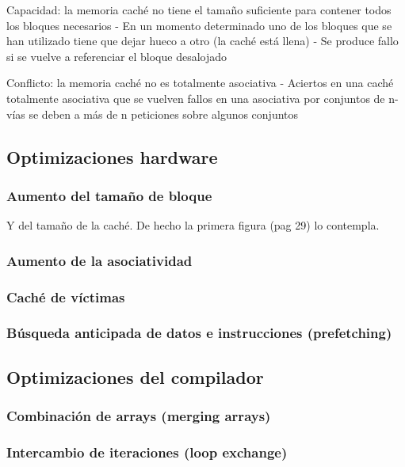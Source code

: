 \documentclass[12pt,onecolumn]{memoir}
\begin{document}
Capacidad: la memoria caché no tiene el tamaño suficiente para 
contener todos los bloques necesarios
- En un momento determinado uno de los bloques que se han 
utilizado tiene que dejar hueco a otro (la caché está llena)
- Se produce fallo si se vuelve a referenciar el bloque desalojado

Conflicto: la memoria caché no es totalmente asociativa 
- Aciertos en una caché totalmente asociativa que se vuelven 
fallos en una asociativa por conjuntos de 
n-vías se deben a más de n peticiones sobre algunos conjuntos

\subsection{Optimizaciones hardware}

\subsubsection{Aumento del tamaño de bloque}

Y del tamaño de la caché. De hecho la primera figura (pag 29) lo contempla.

\subsubsection{Aumento de la asociatividad}

\subsubsection{Caché de víctimas}

\subsubsection{Búsqueda anticipada de datos e instrucciones (prefetching)}

\subsection{Optimizaciones del compilador}

\subsubsection{Combinación de arrays (merging arrays)}

\subsubsection{Intercambio de iteraciones (loop exchange)}
\end{document}

